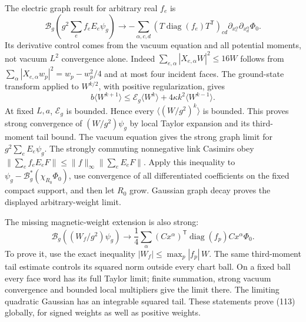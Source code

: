 \documentclass[11pt]{article}
\begin{document}
The electric graph result for arbitrary real $f_e$ is
\[
 \mathcal B_g\left(g^2\sum_ef_eE_e\psi_g\right)
 \longrightarrow
 -\sum_{\alpha,c,d}(T\operatorname{diag}(f_e)T^{\mathsf T})_{cd}
              \partial_{x_c^\alpha}\partial_{x_d^\alpha}\Phi_0 .
\]
Its derivative control comes from the vacuum equation and all potential
moments, not vacuum $L^2$ convergence alone. Indeed
$\sum_{e,\alpha}|X_{e,\alpha}W|^2\le16W$ follows from
$\sum_\alpha|X_{e,\alpha}w_p|^2=w_p-w_p^2/4$ and at most four incident
faces. The ground-state transform applied to $W^{k/2}$, with positive
regularization, gives
\[
 b\langle W^{k+1}\rangle
 \le\mathcal E_g\langle W^k\rangle+4\kappa k^2\langle W^{k-1}\rangle.
\]
At fixed $L,a$, $\mathcal E_g$ is bounded. Hence every
$\langle(W/g^2)^k\rangle$ is bounded. This proves strong convergence
of $(W/g^2)\psi_g$ by local Taylor expansion and its third-moment
tail bound. The vacuum equation gives the strong graph limit for
$g^2\sum_eE_e\psi_g$.
The strongly commuting nonnegative link Casimirs obey
$\|\sum_ef_eE_eF\|\le\|f\|_\infty\|\sum_eE_eF\|$.
Apply this inequality to $\psi_g-\mathcal B_g^*(\chi_{R_0}\Phi_0)$,
use convergence of all differentiated coefficients on the fixed
compact support, and then let $R_0$ grow. Gaussian graph decay proves
the displayed arbitrary-weight limit.

The missing magnetic-weight extension is also strong:
\begin{equation}\label{eq:low-mag}
 \mathcal B_g((W_f/g^2)\psi_g)
 \longrightarrow \frac14\sum_\alpha
 (Cx^\alpha)^{\mathsf T}\operatorname{diag}(f_p)Cx^\alpha\Phi_0.
\end{equation}
To prove it, use the exact inequality
$|W_f|\le\max_p|f_p|\,W$. The same third-moment tail estimate controls
its squared norm outside every chart ball. On a fixed ball every face
word has its full Taylor limit; finite summation, strong vacuum
convergence and bounded local multipliers give the limit there.
The limiting quadratic Gaussian has an integrable squared tail.
These statements prove (113) globally, for signed weights
as well as positive weights.
\end{document}
